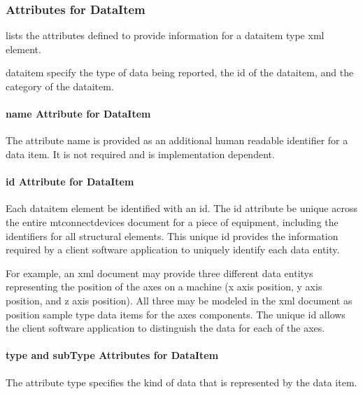 \subsubsection{Attributes for DataItem}
\label{sec:Attributes for DataItem}

 lists the attributes defined to provide information for a \gls{dataitem} type \gls{xml} element.  

\gls{dataitem} \must specify the type of data being reported, the id of the \gls{dataitem}, and the \gls{category} of the \gls{dataitem}.  



\paragraph{name Attribute for DataItem}\mbox{}

The attribute \gls{name} is provided as an additional human readable identifier for a data item.  It is not required and is implementation dependent.

\paragraph{id Attribute for DataItem}\mbox{}

Each \gls{dataitem} element \must be identified with an \gls{id}.   The \gls{id} attribute \must be unique across the entire \gls{mtconnectdevices} document for a piece of equipment, including the identifiers for all \glspl{structural element}.  This unique \gls{id} provides the information required by a client software application to uniquely identify each \gls{data entity}.

For example, an \gls{xml} document may provide three different \glspl{data entity} representing the position of the axes on a machine (x axis position, y axis position, and z axis position).  All three may be modeled in the \gls{xml} document as \gls{position sample} type data items for the \gls{axes} components.  The unique \gls{id} allows the client software application to distinguish the data for each of the axes.

\newpage

\paragraph{type and subType Attributes for DataItem}\mbox{}

The attribute \gls{type} specifies the kind of data that is represented by the data item.

